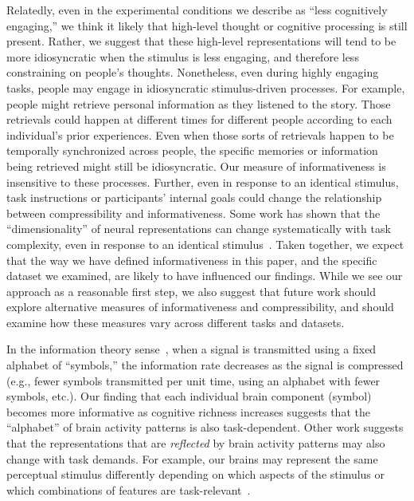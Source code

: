 \documentclass[english, 11pt]{article}
\begin{document}
Relatedly, even in the experimental conditions we describe as ``less
cognitively engaging,'' we think it likely that high-level thought or cognitive
processing is still present. Rather, we suggest that these high-level
representations will tend to be more idiosyncratic when the stimulus is less
engaging, and therefore less constraining on people's thoughts. Nonetheless,
even during highly engaging tasks, people may engage in idiosyncratic
stimulus-driven processes. For example, people might retrieve personal
information as they listened to the story. Those retrievals could happen at
different times for different people according to each individual's prior
experiences. Even when those sorts of retrievals happen to be temporally
synchronized across people, the specific memories or information being
retrieved might still be idiosyncratic. Our measure of informativeness is
insensitive to these processes. Further, even in response to an identical
stimulus, task instructions or participants' internal goals could change the
relationship between compressibility and informativeness. Some work has shown
that the ``dimensionality'' of neural representations can change systematically
with task complexity, even in response to an identical
stimulus~\citep{MackEtal20}. Taken together, we expect that the way we have
defined informativeness in this paper, and the specific dataset we examined,
are likely to have influenced our findings. While we see our approach as a
reasonable first step, we also suggest that future work should explore
alternative measures of informativeness and compressibility, and should examine
how these measures vary across different tasks and datasets.

In the information theory sense~\citep{Shan48}, when a signal is transmitted
using a fixed alphabet of ``symbols,'' the information rate decreases as the
signal is compressed (e.g., fewer symbols transmitted per unit time, using an
alphabet with fewer symbols, etc.). Our finding that each individual brain
component (symbol) becomes more informative as cognitive richness increases
suggests that the ``alphabet'' of brain activity patterns is also
task-dependent. Other work suggests that the representations that are
\textit{reflected} by brain activity patterns may also change with task
demands. For example, our brains may represent the same perceptual stimulus
differently depending on which aspects of the stimulus or which combinations of
features are task-relevant~\citep{MackEtal20}.
\end{document}
